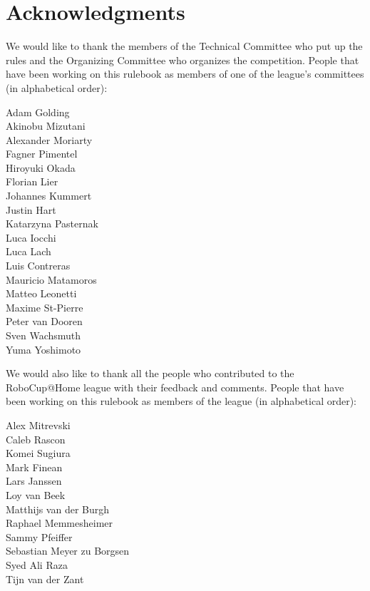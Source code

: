 \section*{Acknowledgments}
\label{sec:acknowledgments}
We would like to thank the members of the Technical Committee who put up the rules and the Organizing Committee who organizes the competition.
People that have been working on this rulebook as members of one of the league's committees (in alphabetical order):
\begin{center}
	\begin{minipage}{0.8\textwidth}
		\begin{multicols}{3}%
			\footnotesize
			\noindent%
			Adam Golding\\
			Akinobu Mizutani\\
			Alexander Moriarty\\
			Fagner Pimentel\\
			Hiroyuki Okada\\
			Florian Lier\\
			Johannes Kummert\\
			Justin Hart\\
			Katarzyna Pasternak\\
			Luca Iocchi\\
			Luca Lach\\
			Luis Contreras\\
			Mauricio Matamoros\\
			Matteo Leonetti\\
			Maxime St-Pierre\\
			Peter van Dooren\\
			Sven Wachsmuth\\
			Yuma Yoshimoto
		\end{multicols}
	\end{minipage}
\end{center}

\noindent We would also like to thank all the people who contributed to the RoboCup@Home league with their feedback and comments.
People that have been working on this rulebook as members of the league (in alphabetical order):
\begin{center}
	\begin{minipage}{0.8\textwidth}
		\begin{multicols}{2}%
			\footnotesize
			\noindent%
			Alex Mitrevski\\
			Caleb Rascon\\
			Komei Sugiura\\
			Mark Finean\\
			Lars Janssen\\
			Loy van Beek\\
			Matthijs van der Burgh\\
			Raphael Memmesheimer\\
			Sammy Pfeiffer\\
			Sebastian Meyer zu Borgsen\\
			Syed Ali Raza\\
			Tijn van der Zant
		\end{multicols}
	\end{minipage}
\end{center}


